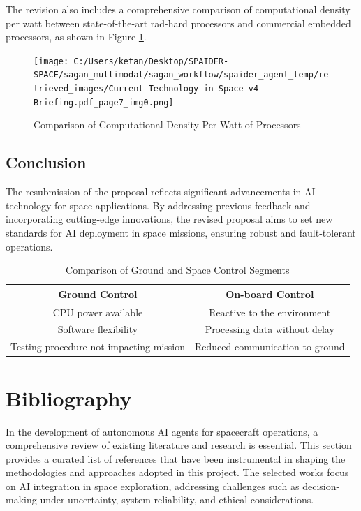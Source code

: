 \documentclass[a4paper, 11pt]{article}
\begin{document}
The revision also includes a comprehensive comparison of computational density per watt between state-of-the-art rad-hard processors and commercial embedded processors, as shown in Figure \ref{fig:comp-density}.

\begin{figure}[htbp]
    \centering
    \texttt{[image: C:/Users/ketan/Desktop/SPAIDER-SPACE/sagan\_multimodal/sagan\_workflow/spaider\_agent\_temp/retrieved\_images/Current Technology in Space v4 Briefing.pdf\_page7\_img0.png]}
    \caption{Comparison of Computational Density Per Watt of Processors}
    \label{fig:comp-density}
\end{figure}

\subsection{Conclusion}

The resubmission of the proposal reflects significant advancements in AI technology for space applications. By addressing previous feedback and incorporating cutting-edge innovations, the revised proposal aims to set new standards for AI deployment in space missions, ensuring robust and fault-tolerant operations.

\begin{table}[htbp]
    \centering
    \caption{Comparison of Ground and Space Control Segments}
    \label{tab:control-segment-comparison}
    \begin{tabular}{|c|c|}
        \hline
        \textbf{Ground Control} & \textbf{On-board Control} \\
        \hline
        CPU power available & Reactive to the environment \\
        Software flexibility & Processing data without delay \\
        Testing procedure not impacting mission & Reduced communication to ground \\
        \hline
    \end{tabular}
\end{table}

\section{Bibliography}

In the development of autonomous AI agents for spacecraft operations, a comprehensive review of existing literature and research is essential. This section provides a curated list of references that have been instrumental in shaping the methodologies and approaches adopted in this project. The selected works focus on AI integration in space exploration, addressing challenges such as decision-making under uncertainty, system reliability, and ethical considerations.
\end{document}
